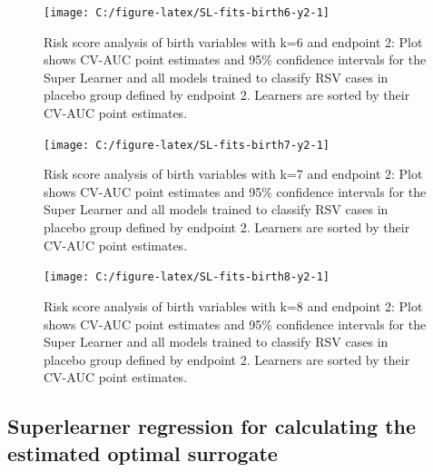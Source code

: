 \documentclass[11pt]{article}
\begin{document}
\begin{figure}[H]

{\centering \texttt{[image: C:/figure-latex/SL-fits-birth6-y2-1]} 

}

\caption[Risk score analysis of birth variables with k=6 and endpoint 2.]{Risk score analysis of birth variables with k=6 and endpoint 2: Plot shows CV-AUC point estimates and 95\% confidence intervals for the Super Learner and all models trained to classify RSV cases in placebo group defined by endpoint 2. Learners are sorted by their CV-AUC point estimates.}\label{fig:SL-fits-birth6-y2}
\end{figure}

\begin{figure}[H]

{\centering \texttt{[image: C:/figure-latex/SL-fits-birth7-y2-1]} 

}

\caption[Risk score analysis of birth variables with k=7 and endpoint 2.]{Risk score analysis of birth variables with k=7 and endpoint 2: Plot shows CV-AUC point estimates and 95\% confidence intervals for the Super Learner and all models trained to classify RSV cases in placebo group defined by endpoint 2. Learners are sorted by their CV-AUC point estimates.}\label{fig:SL-fits-birth7-y2}
\end{figure}

\begin{figure}[H]

{\centering \texttt{[image: C:/figure-latex/SL-fits-birth8-y2-1]} 

}

\caption[Risk score analysis of birth variables with k=8 and endpoint 2.]{\label{fig:riskscoreAppendix2}Risk score analysis of birth variables with k=8 and endpoint 2: Plot shows CV-AUC point estimates and 95\% confidence intervals for the Super Learner and all models trained to classify RSV cases in placebo group defined by endpoint 2. Learners are sorted by their CV-AUC point estimates.}\label{fig:SL-fits-birth8-y2}
\end{figure}

\hypertarget{superlearner-regression-for-calculating-the-estimated-optimal-surrogate-1}{%
\subsection{Superlearner regression for calculating the estimated optimal surrogate}\label{superlearner-regression-for-calculating-the-estimated-optimal-surrogate-1}}
\end{document}
